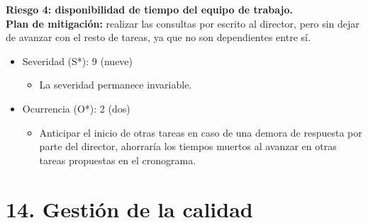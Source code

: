 \documentclass[
11pt, %
codirector, %
]{charter}
\begin{document}
\textbf{Riesgo 4: disponibilidad de tiempo del equipo de trabajo.}\\
\textbf{Plan de mitigación:} realizar las consultas por escrito al director, pero sin dejar de avanzar con el resto de tareas, ya que no son dependientes entre sí. 
\begin{itemize}
	\item Severidad (S*): 9 (nueve)
        \begin{itemize}
			\item La severidad permanece invariable.
		\end{itemize}
	\item Ocurrencia (O*): 2 (dos)
        \begin{itemize}
			\item Anticipar el inicio de otras tareas en caso de una demora de respuesta por parte del director, ahorraría los tiempos muertos al avanzar en otras tareas propuestas en el cronograma.
		\end{itemize}
	\end{itemize}

\section{14. Gestión de la calidad}
\label{sec:calidad}
\end{document}
